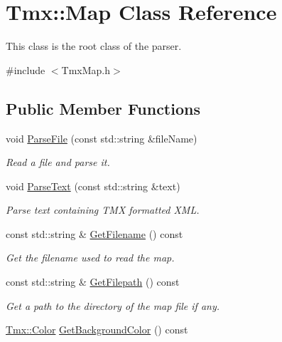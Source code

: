 \hypertarget{classTmx_1_1Map}{\section{Tmx\-:\-:Map Class Reference}
\label{classTmx_1_1Map}
}


This class is the root class of the parser.  




{\ttfamily \#include $<$Tmx\-Map.\-h$>$}

\subsection*{Public Member Functions}
\begin{DoxyCompactItemize}
\item 
void \hyperlink{classTmx_1_1Map_a6402c3b55e687cd561b3eb3c16341d64}{Parse\-File} (const std\-::string \&file\-Name)
\begin{DoxyCompactList}\small\item\em Read a file and parse it. \end{DoxyCompactList}\item 
\hypertarget{classTmx_1_1Map_a5b1e7fb80a243bf439eb59143588e6f1}{void \hyperlink{classTmx_1_1Map_a5b1e7fb80a243bf439eb59143588e6f1}{Parse\-Text} (const std\-::string \&text)}\label{classTmx_1_1Map_a5b1e7fb80a243bf439eb59143588e6f1}

\begin{DoxyCompactList}\small\item\em Parse text containing T\-M\-X formatted X\-M\-L. \end{DoxyCompactList}\item 
\hypertarget{classTmx_1_1Map_ac8d4b67bc03893c8ddf94e5ca84addd5}{const std\-::string \& \hyperlink{classTmx_1_1Map_ac8d4b67bc03893c8ddf94e5ca84addd5}{Get\-Filename} () const }\label{classTmx_1_1Map_ac8d4b67bc03893c8ddf94e5ca84addd5}

\begin{DoxyCompactList}\small\item\em Get the filename used to read the map. \end{DoxyCompactList}\item 
\hypertarget{classTmx_1_1Map_a26f2a6a44512f00404bf800f31fc4b90}{const std\-::string \& \hyperlink{classTmx_1_1Map_a26f2a6a44512f00404bf800f31fc4b90}{Get\-Filepath} () const }\label{classTmx_1_1Map_a26f2a6a44512f00404bf800f31fc4b90}

\begin{DoxyCompactList}\small\item\em Get a path to the directory of the map file if any. \end{DoxyCompactList}\item 
\hypertarget{classTmx_1_1Map_a26f1b6f42e6fba38764d8a670bbc9634}{\hyperlink{classTmx_1_1Color}{Tmx\-::\-Color} \hyperlink{classTmx_1_1Map_a26f1b6f42e6fba38764d8a670bbc9634}{Get\-Background\-Color} () const }\label{classTmx_1_1Map_a26f1b6f42e6fba38764d8a670bbc9634}


\end{DoxyCompactItemize}
